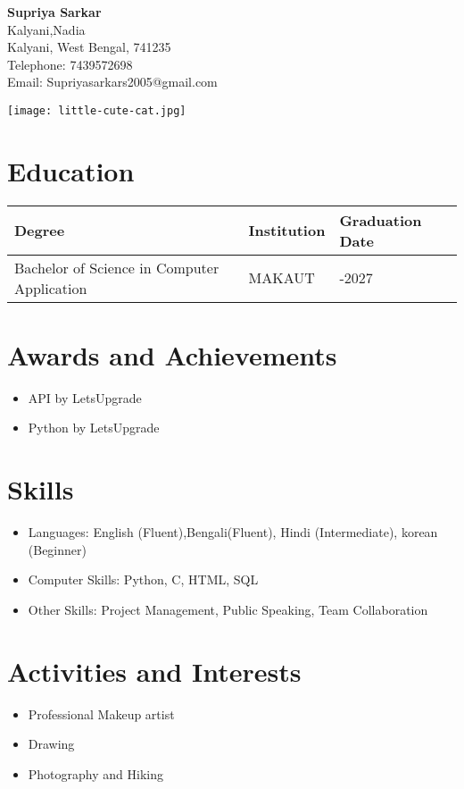 \documentclass[a4paper,10pt]{article}
\begin{document}
\begin{center}
    \textbf{\Huge Supriya Sarkar} \\
    \vspace{5pt}
    Kalyani,Nadia \\
    Kalyani, West Bengal, 741235 \\
    Telephone: 7439572698 \\
    Email: Supriyasarkars2005@gmail.com \\
\end{center}

\begin{minipage}[t]{0.3\textwidth}
    \texttt{[image: little-cute-cat.jpg]}
\end{minipage}
\hfill
\begin{minipage}[t]{0.65\textwidth}
    \section*{Education}
    \begin{tabular}{|>{\centering\arraybackslash}m{3cm}|>{\centering\arraybackslash}m{5cm}|>{\centering\arraybackslash}m{3cm}|}
        \hline
        \textbf{Degree} & \textbf{Institution} & \textbf{Graduation Date} \\
        \hline
        Bachelor of Science in Computer Application & MAKAUT & 2023-2027 \\
        \hline
    \end{tabular}
\end{minipage}

\vspace{15pt}

\section*{Awards and Achievements}
\begin{itemize}[leftmargin=*]
    \item API by LetsUpgrade
    \item Python by LetsUpgrade
\end{itemize}

\vspace{15pt}

\section*{Skills}
\begin{itemize}[leftmargin=*]
    \item Languages: English (Fluent),Bengali(Fluent), Hindi (Intermediate), korean (Beginner)
    \item Computer Skills: Python, C, HTML, SQL
    \item Other Skills: Project Management, Public Speaking, Team Collaboration
\end{itemize}

\vspace{15pt}

\section*{Activities and Interests}
\begin{itemize}[leftmargin=*]
    \item Professional Makeup artist
    \item Drawing
    \item Photography and Hiking
\end{itemize}
\end{document}
